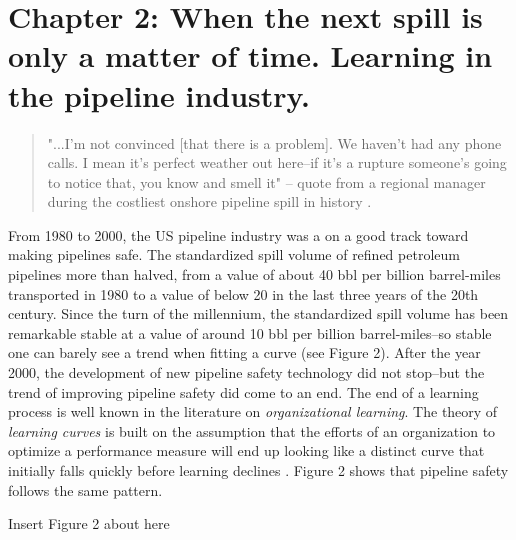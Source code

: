 \section{Chapter 2: When the next spill is only a matter of time. Learning in the pipeline industry.}

\begin{singlespace}
	\begin{quote}
		"...I'm not convinced [that there is a problem]. We haven't had any phone calls. I mean it's perfect weather out here--if it's a rupture someone's going to notice that, you know and smell it" -- quote from a regional manager during the costliest onshore pipeline spill in history \citet[p. 100]{NTSB2012}.
	\end{quote}
\end{singlespace}

From 1980 to 2000, the US pipeline industry was a on a good track toward making pipelines safe. The standardized spill volume of refined petroleum pipelines more than halved, from a value of about 40 bbl per billion barrel-miles transported in 1980 to a value of below 20 in the last three years of the 20th century. Since the turn of the millennium, the standardized spill volume has been remarkable stable at a value of around 10 bbl per billion barrel-miles--so stable one can barely see a trend when fitting a curve (see Figure 2). After the year 2000, the development of new pipeline safety technology did not stop--but the trend of improving pipeline safety did come to an end. The end of a learning process is well known in the literature on \textit{organizational learning}. The theory of \textit{learning curves} is built on the assumption that the efforts of an organization to optimize a performance measure will end up looking like a distinct curve that initially falls quickly before learning declines \citep{Argote2013-1}. Figure 2 shows that pipeline safety follows the same pattern. 

{\noindent}\dotfill

\centerline{Insert Figure 2 about here}

{\noindent}\dotfill

